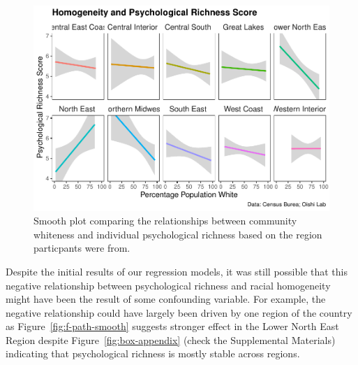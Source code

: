 \documentclass[
  man,floatsintext]{apa7}
\begin{document}
\begin{figure}[H]
\includegraphics[width=1\linewidth]{Richness-Diversity-Markdown_files/figure-latex/e-path-smooth-1} \caption{Smooth plot comparing the relationships between community whiteness and individual psychological richness based on the region particpants were from.}\label{fig:e-path-smooth}
\end{figure}



Despite the initial results of our regression models, it was still possible that this negative relationship between psychological richness and racial homogeneity might have been the result of some confounding variable. For example, the negative relationship could have largely been driven by one region of the country as Figure~\ref{fig:f-path-smooth} suggests stronger effect in the Lower North East Region despite Figure~\ref{fig:box-appendix} (check the Supplemental Materials) indicating that psychological richness is mostly stable across regions.
\end{document}
